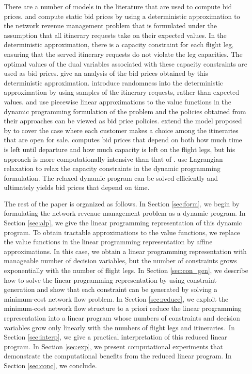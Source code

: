There are a number of models in the literature that are used to compute bid prices.  and  compute static bid prices by using a deterministic approximation to the network revenue management problem that is formulated under the assumption that all itinerary requests take on their expected values. In the deterministic approximation, there is a capacity constraint for each flight leg, ensuring that the served itinerary requests do not violate the leg capacities. The optimal values of the dual variables associated with these capacity constraints are used as bid prices.  give an analysis of the bid prices obtained by this deterministic approximation.  introduce randomness into the deterministic approximation by using samples of the itinerary requests, rather than expected values.  and  use piecewise linear approximations to the value functions in the dynamic programming formulation of the problem and the policies obtained from their approaches can be viewed as bid price policies.  extend the model proposed by  to cover the case where each customer makes a choice among the itineraries that are open for sale.  computes bid prices that depend on both how much time is left until departure and how much capacity is left on the flight legs, but his approach is more computationally intensive than that of .  use Lagrangian relaxation to relax the capacity constraints in the dynamic programming formulation. The relaxed dynamic program can be solved efficiently and ultimately yields bid prices that depend on time.

The rest of the paper is organized as follows. In Section \ref{sec:form}, we begin by formulating the network revenue management problem as a dynamic program. In Section \ref{sec:alp}, we give the  linear programming representation of this dynamic program. To obtain tractable approximations to the value functions, we replace the value functions in the linear programming representation by affine approximations. In this case, we obtain a linear programming representation with manageable number of decision variables, but the number of constraints grows exponentially with the number of flight legs. In Section \ref{sec:con_gen}, we describe how to solve the linear programming representation by using constraint generation and show that each constraint can be generated by solving a minimum-cost network flow problem. In Section \ref{sec:reduce}, we exploit the minimum-cost network flow structure to a priori reduce the linear programming representation into a linear program whose numbers of constraints and decision variables grow only linearly with the numbers of flight legs and itineraries.~In Section \ref{sec:interp}, we give a practical interpretation of this reduced linear program. In Section \ref{sec:exp}, we present computational experiments that demonstrate the computational benefits from the reduced linear program. In Section \ref{sec:conc}, we conclude.


